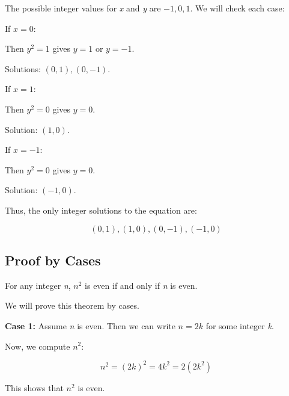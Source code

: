 The possible integer values for \emph{x} and \emph{y} are \( -1, 0, 1 \). We will check each case:
\vspace{\baselineskip}

If \( x = 0 \):
\vspace{\baselineskip}

Then \( y^2 = 1 \) gives \( y = 1 \) or \( y = -1 \).
\vspace{\baselineskip}

Solutions: \( (0, 1), (0, -1) \).
\vspace{\baselineskip}

If \( x = 1 \):
\vspace{\baselineskip}

Then \( y^2 = 0 \) gives \( y = 0 \).
\vspace{\baselineskip}

Solution: \( (1, 0) \).
\vspace{\baselineskip}

If \( x = -1 \):
\vspace{\baselineskip}

Then \( y^2 = 0 \) gives \( y = 0 \).
\vspace{\baselineskip}

Solution: \( (-1, 0) \).
\vspace{\baselineskip}

Thus, the only integer solutions to the equation are:
	
\[
	(0, 1), (1, 0), (0, -1), (-1, 0)
\]

\QED

\subsection{Proof by Cases}

For any integer \emph{n}, \( n^2 \) is even if and only if \emph{n} is even.
\vspace{\baselineskip}

We will prove this theorem by cases.
\vspace{\baselineskip}

\textbf{Case 1:} Assume \emph{n} is even. Then we can write \( n = 2k \) for some integer \emph{k}.
\vspace{\baselineskip}

Now, we compute \( n^2 \):

\[
	n^2 = {(2k)}^2 = 4k^2 = 2(2k^2)
\]

This shows that \( n^2 \) is even.
\vspace{\baselineskip}

